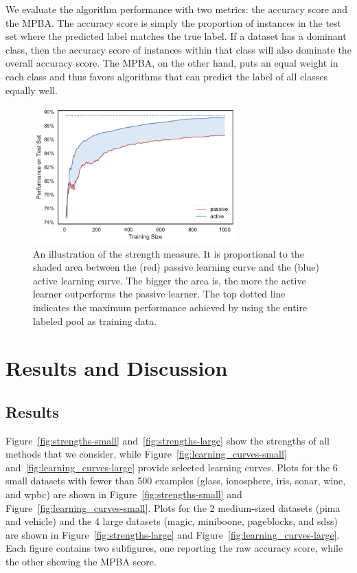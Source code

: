 \documentclass[fleqn,10pt,lineno]{wlpeerj} %
\begin{document}
We evaluate the algorithm performance with two metrics: the accuracy score and
the MPBA. The accuracy score is simply the proportion of instances in
the test set where the predicted label matches the true label. If a dataset has
a dominant class, then the accuracy score of instances within that class will
also dominate the overall accuracy score. The MPBA, on the other hand, puts
an equal weight in each class and thus favors algorithms that can predict
the label of all classes equally well.

\begin{figure}[htbp]
	\centering
	\includegraphics[width=0.7\textwidth]{figures/strength}
	\caption[Strength Measure]{An illustration of the strength measure. It is
	proportional to the shaded area between the (red) passive learning curve
	and the (blue) active learning curve. The bigger the area is, the more the
	active learner outperforms the passive learner. The top dotted line
	indicates the maximum performance achieved by using the entire labeled
	pool as training data.}
	\label{fig:strength}
\end{figure}

\section{Results and Discussion}\label{sec:discuss}

\subsection{Results}

Figure~\ref{fig:strengths-small} and~\ref{fig:strengths-large} show the
strengths of all methods that we consider, while
Figure~\ref{fig:learning_curves-small} and~\ref{fig:learning_curves-large}
provide selected learning curves. Plots for the 6 small datasets with fewer
than 500 examples (glass, ionosphere, iris, sonar, wine, and wpbc) are shown in
Figure~\ref{fig:strengths-small} and Figure~\ref{fig:learning_curves-small}.
Plots for the 2 medium-sized datasets (pima and vehicle) and the 4 large
datasets (magic, miniboone, pageblocks, and sdss) are shown in
Figure~\ref{fig:strengths-large} and Figure~\ref{fig:learning_curves-large}.
Each figure contains two subfigures, one reporting the raw accuracy score,
while the other showing the MPBA score.
\end{document}
